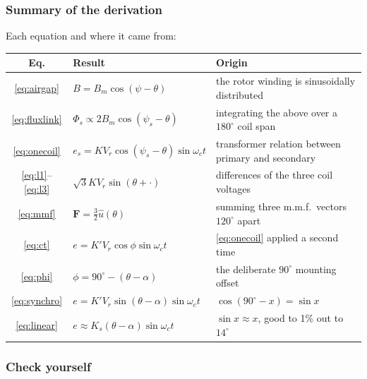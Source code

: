 \documentclass[11pt,a4paper]{article}
\begin{document}
\subsubsection{Summary of the derivation}

\begin{keyidea}
Each equation and where it came from:
\begin{center}
\begin{tabular}{clP{6.9cm}}
\toprule
Eq. & Result & Origin \\
\midrule
\eqref{eq:airgap}  & $B=B_{m}\cos(\psi-\theta)$
   & the rotor winding is sinusoidally distributed \\
\eqref{eq:fluxlink}& $\Phi_{s}\propto2B_{m}\cos(\psi_{s}-\theta)$
   & integrating the above over a $180^\circ$ coil span \\
\eqref{eq:onecoil} & $e_{s}=KV_{r}\cos(\psi_{s}-\theta)\sin\omega_{c}t$
   & transformer relation between primary and secondary \\
\eqref{eq:l1}--\eqref{eq:l3} & $\sqrt{3}KV_{r}\sin(\theta+\cdot)$
   & differences of the three coil voltages \\
\eqref{eq:mmf}     & $\mathbf{F}=\tfrac{3}{2}\hat{u}(\theta)$
   & summing three m.m.f.\ vectors $120^\circ$ apart \\
\eqref{eq:ct}      & $e=K'V_{r}\cos\phi\sin\omega_{c}t$
   & \eqref{eq:onecoil} applied a second time \\
\eqref{eq:phi}     & $\phi=90^\circ-(\theta-\alpha)$
   & the deliberate $90^\circ$ mounting offset \\
\eqref{eq:synchro} & $e=K'V_{r}\sin(\theta-\alpha)\sin\omega_{c}t$
   & $\cos(90^\circ-x)=\sin x$ \\
\eqref{eq:linear}  & $e\approx K_{s}(\theta-\alpha)\sin\omega_{c}t$
   & $\sin x\approx x$, good to 1\% out to $14^\circ$ \\
\bottomrule
\end{tabular}
\end{center}
\end{keyidea}

\subsubsection*{Check yourself}
\end{document}
